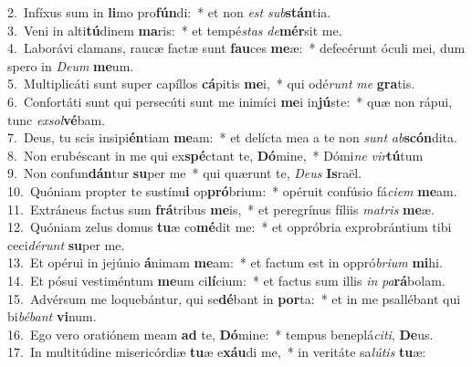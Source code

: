 {2.~}Infíxus sum in \textbf{li}mo pro\textbf{fún}di:~* et non \textit{est} \textit{sub}\textbf{stán}tia.\\
{3.~}Veni in alti\textbf{tú}dinem \textbf{ma}ris:~* et tempé\textit{stas} \textit{de}\textbf{mér}sit me.\\
{4.~}Laborávi clamans, raucæ factæ sunt \textbf{fau}ces \textbf{me}æ:~* defecérunt óculi mei, dum spero in \textit{De}\textit{um} \textbf{me}um.\\
{5.~}Multiplicáti sunt super capíllos \textbf{cá}pitis \textbf{me}i,~* qui odé\textit{runt} \textit{me} \textbf{gra}tis.\\
{6.~}Confortáti sunt qui persecúti sunt me inimíci \textbf{me}i in\textbf{jú}ste:~* quæ non rápui, tunc \textit{ex}\textit{sol}\textbf{vé}bam.\\
{7.~}Deus, tu scis insipi\textbf{én}tiam \textbf{me}am:~* et delícta mea a te non \textit{sunt} \textit{ab}\textbf{scón}dita.\\
{8.~}Non erubéscant in me qui ex\textbf{spé}ctant te, \textbf{Dó}mine,~* Dómi\textit{ne} \textit{vir}\textbf{tú}tum\\
{9.~}Non confun\textbf{dán}tur \textbf{su}per me~* qui quærunt te, \textit{De}\textit{us} \textbf{Is}raël.\\
{10.~}Quóniam propter te sustínu\textbf{i} op\textbf{pró}brium:~* opéruit confúsio fá\textit{ci}\textit{em} \textbf{me}am.\\
{11.~}Extráneus factus sum \textbf{frá}tribus \textbf{me}is,~* et peregrínus fíliis \textit{ma}\textit{tris} \textbf{me}æ.\\
{12.~}Quóniam zelus domus \textbf{tu}æ co\textbf{mé}dit me:~* et oppróbria exprobrántium tibi ceci\textit{dé}\textit{runt} \textbf{su}per me.\\
{13.~}Et opérui in jejúnio \textbf{á}nimam \textbf{me}am:~* et factum est in oppró\textit{bri}\textit{um} \textbf{mi}hi.\\
{14.~}Et pósui vestiméntum \textbf{me}um ci\textbf{lí}cium:~* et factus sum illis \textit{in} \textit{pa}\textbf{rá}bolam.\\
{15.~}Advérsum me loquebántur, qui se\textbf{dé}bant in \textbf{por}ta:~* et in me psallébant qui bi\textit{bé}\textit{bant} \textbf{vi}num.\\
{16.~}Ego vero oratiónem meam \textbf{ad} te, \textbf{Dó}mine:~* tempus beneplá\textit{ci}\textit{ti}, \textbf{De}us.\\
{17.~}In multitúdine misericórdiæ \textbf{tu}æ e\textbf{xáu}di me,~* in veritáte sa\textit{lú}\textit{tis} \textbf{tu}æ:\\
